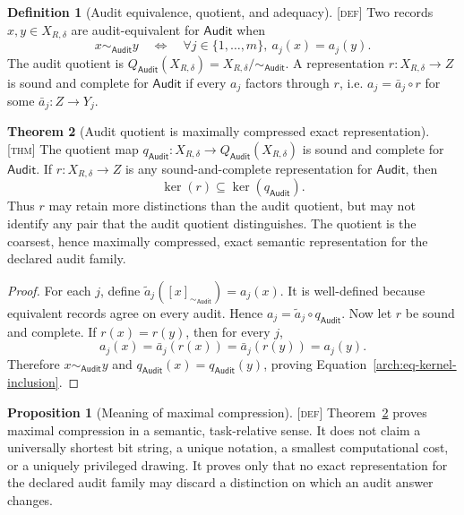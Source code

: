 \documentclass[11pt]{article}
\newcommand{\Audit}{\ensuremath{\mathsf{Audit}}}
\newcommand{\Defn}{\textsc{[def]}}
\newcommand{\Thm}{\textsc{[thm]}}
\theoremstyle{definition}
\newtheorem{sdefinition}{Definition}
\newtheorem{sproposition}{Proposition}
\newtheorem{stheorem}[sdefinition]{Theorem}
\begin{document}
\begin{sdefinition}[Audit equivalence, quotient, and adequacy]
\label{arch:def-audit-quotient}
\Defn{} Two records $x,y\in X_{R,\delta}$ are audit-equivalent for $\Audit$ when
\begin{equation}
x\sim_{\Audit}y\quad\Longleftrightarrow\quad
\forall j\in\{1,\ldots,m\},\ a_j(x)=a_j(y).
\label{arch:eq-audit-equivalence}
\end{equation}
The audit quotient is $Q_{\Audit}(X_{R,\delta})=X_{R,\delta}/\sim_{\Audit}$. A
representation $r:X_{R,\delta}\to Z$ is sound and complete for $\Audit$ if every
$a_j$ factors through $r$, i.e. $a_j=\bar a_j\circ r$ for some
$\bar a_j:Z\to Y_j$.
\end{sdefinition}

\begin{stheorem}[Audit quotient is maximally compressed exact representation]
\label{arch:thm-compression}
\Thm{} The quotient map $q_{\Audit}:X_{R,\delta}\to Q_{\Audit}(X_{R,\delta})$ is
sound and complete for $\Audit$. If $r:X_{R,\delta}\to Z$ is any sound-and-complete
representation for $\Audit$, then
\begin{equation}
\ker(r)\subseteq\ker(q_{\Audit}).
\label{arch:eq-kernel-inclusion}
\end{equation}
Thus $r$ may retain more distinctions than the audit quotient, but may not identify
any pair that the audit quotient distinguishes. The quotient is the coarsest, hence
maximally compressed, exact semantic representation for the declared audit family.
\end{stheorem}

\begin{proof}
For each $j$, define $\widetilde a_j([x]_{\sim_{\Audit}})=a_j(x)$. It is
well-defined because equivalent records agree on every audit. Hence
$a_j=\widetilde a_j\circ q_{\Audit}$. Now let $r$ be sound and complete. If
$r(x)=r(y)$, then for every $j$,
\[
a_j(x)=\bar a_j(r(x))=\bar a_j(r(y))=a_j(y).
\]
Therefore $x\sim_{\Audit}y$ and $q_{\Audit}(x)=q_{\Audit}(y)$, proving
Equation~\eqref{arch:eq-kernel-inclusion}.
\end{proof}

\begin{sproposition}[Meaning of maximal compression]
\label{arch:prop-maximal-compression}
\Defn{} Theorem~\ref{arch:thm-compression} proves maximal compression in a
semantic, task-relative sense. It does not claim a universally shortest bit string,
a unique notation, a smallest computational cost, or a uniquely privileged drawing.
It proves only that no exact representation for the declared audit family may
discard a distinction on which an audit answer changes.
\end{sproposition}
\end{document}

